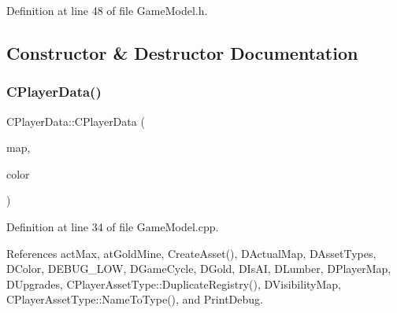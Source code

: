 Definition at line 48 of file Game\+Model.\+h.



\subsection{Constructor \& Destructor Documentation}
\hypertarget{classCPlayerData_af60332b967ddb3044bd71376656bcdc0}{}\label{classCPlayerData_af60332b967ddb3044bd71376656bcdc0} 
\subsubsection{\texorpdfstring{C\+Player\+Data()}{CPlayerData()}}
{\footnotesize\ttfamily C\+Player\+Data\+::\+C\+Player\+Data (\begin{DoxyParamCaption}\item[{std\+::shared\+\_\+ptr$<$ \hyperlink{classCAssetDecoratedMap}{C\+Asset\+Decorated\+Map} $>$}]{map,  }\item[{\hyperlink{GameDataTypes_8h_aafb0ca75933357ff28a6d7efbdd7602f}{E\+Player\+Color}}]{color }\end{DoxyParamCaption})}



Definition at line 34 of file Game\+Model.\+cpp.



References act\+Max, at\+Gold\+Mine, Create\+Asset(), D\+Actual\+Map, D\+Asset\+Types, D\+Color, D\+E\+B\+U\+G\+\_\+\+L\+OW, D\+Game\+Cycle, D\+Gold, D\+Is\+AI, D\+Lumber, D\+Player\+Map, D\+Upgrades, C\+Player\+Asset\+Type\+::\+Duplicate\+Registry(), D\+Visibility\+Map, C\+Player\+Asset\+Type\+::\+Name\+To\+Type(), and Print\+Debug.


